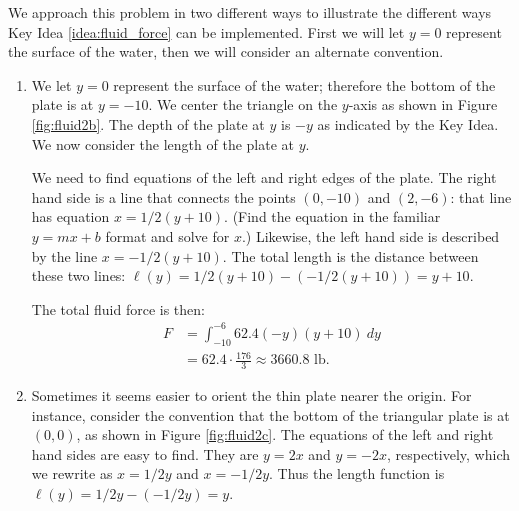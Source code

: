 {We approach this problem in two different ways to illustrate the different ways Key Idea \ref{idea:fluid_force} can be implemented. First we will let $y=0$ represent the surface of the water, then we will consider an alternate convention.
	\begin{enumerate}
	\item		We let $y=0$ represent the surface of the water; therefore the bottom of the plate is at $y=-10$. We center the triangle on the $y$-axis as shown in Figure \ref{fig:fluid2b}. The depth of the plate at $y$ is $-y$ as indicated by the Key Idea. We now consider the length of the plate at $y$.
		
	We need to find equations of the left and right edges of the plate. The right hand side is a line that connects the points $(0,-10)$ and $(2,-6)$: that line has equation $x=1/2(y+10)$. (Find the equation in the familiar $y=mx+b$ format and solve for $x$.) Likewise, the left hand side is described by the line $x=-1/2(y+10)$. The total length is the distance between these two lines: $\ell(y)=1/2(y+10) - (-1/2(y+10)) = y+10.$
	
The total fluid force is then:
\begin{align*}
F 	&=	\int_{-10}^{-6} 62.4(-y)(y+10)\ dy \\
		&=	62.4\cdot \frac{176}{3} \approx	3660.8\text{ lb}.
\end{align*}

\item		Sometimes it seems easier to orient the thin plate nearer the origin. For instance, consider the convention that the bottom of the triangular plate is at $(0,0)$, as shown in Figure \ref{fig:fluid2c}. The equations of the left and right hand sides are easy to find. They are $y=2x$ and $y=-2x$, respectively, which we rewrite as $x= 1/2y$ and $x=-1/2y$. Thus the length function is $\ell(y) = 1/2y-(-1/2y) = y$. 


\end{enumerate}}
